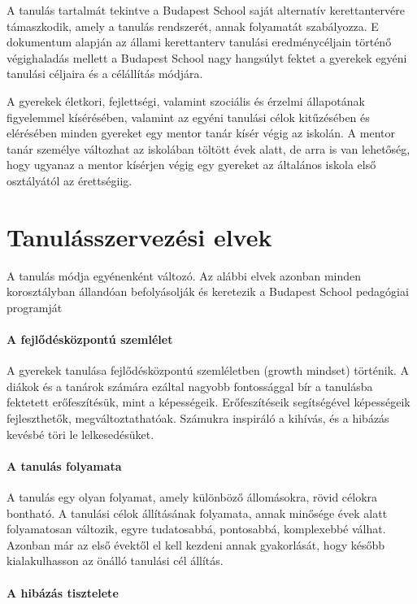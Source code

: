 A tanulás tartalmát tekintve a Budapest School saját alternatív
kerettantervére támaszkodik, amely a tanulás rendszerét, annak
folyamatát szabályozza. E dokumentum alapján az állami kerettanterv
tanulási eredménycéljain történő végighaladás mellett a Budapest School
nagy hangsúlyt fektet a gyerekek egyéni tanulási céljaira és a
célállítás módjára.

A gyerekek életkori, fejlettségi, valamint szociális és érzelmi
állapotának figyelemmel kísérésében, valamint az egyéni tanulási célok
kitűzésében és elérésében minden gyereket egy mentor tanár kísér végig
az iskolán. A mentor tanár személye változhat az iskolában töltött évek
alatt, de arra is van lehetőség, hogy ugyanaz a mentor kísérjen végig
egy gyereket az általános iskola első osztályától az érettségiig.


\section{Tanulásszervezési elvek}
\label{sec:tanulasszervezesi_elvek}
A tanulás módja egyénenként változó. Az alábbi elvek azonban minden
korosztályban állandóan befolyásolják és keretezik a Budapest School
pedagógiai programját

\paragraph{A fejlődésközpontú szemlélet}

A gyerekek tanulása fejlődésközpontú szemléletben (growth mindset)
történik. A diákok és a tanárok számára ezáltal nagyobb fontossággal
bír a tanulásba fektetett erőfeszítésük, mint a képességeik.
Erőfeszítéseik segítségével képességeik fejleszthetők,
megváltoztathatóak. Számukra inspiráló a kihívás, és a hibázás kevésbé
töri le lelkesedésüket.

\paragraph{A tanulás folyamata}

A tanulás egy olyan folyamat, amely különböző állomásokra, rövid célokra
bontható. A tanulási célok állításának folyamata, annak minősége évek
alatt folyamatosan változik, egyre tudatosabbá, pontosabbá, komplexebbé
válhat. Azonban már az első évektől el kell kezdeni annak gyakorlását,
hogy később kialakulhasson az önálló tanulási cél állítás.

\paragraph{A hibázás tisztelete}

